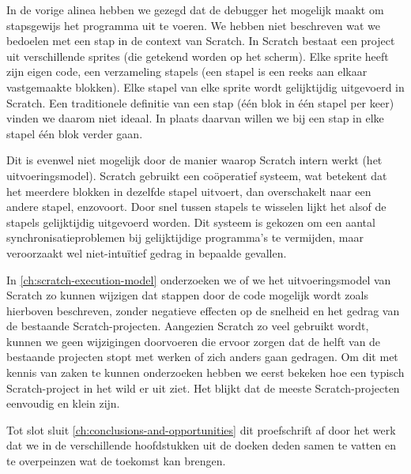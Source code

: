 \documentclass[main]{subfiles}
\begin{document}
In de vorige alinea hebben we gezegd dat de debugger het mogelijk maakt om stapsgewijs het programma uit te voeren.
We hebben niet beschreven wat we bedoelen met een stap in de context van Scratch.
In Scratch bestaat een project uit verschillende sprites (die getekend worden op het scherm).
Elke sprite heeft zijn eigen code, een verzameling stapels (een stapel is een reeks aan elkaar vastgemaakte blokken).
Elke stapel van elke sprite wordt gelijktijdig uitgevoerd in Scratch.
Een traditionele definitie van een stap (één blok in één stapel per keer) vinden we daarom niet ideaal.
In plaats daarvan willen we bij een stap in elke stapel één blok verder gaan.

Dit is evenwel niet mogelijk door de manier waarop Scratch intern werkt (het uitvoeringsmodel).
Scratch gebruikt een coöperatief systeem, wat betekent dat het meerdere blokken in dezelfde stapel uitvoert, dan overschakelt naar een andere stapel, enzovoort.
Door snel tussen stapels te wisselen lijkt het alsof de stapels gelijktijdig uitgevoerd worden.
Dit systeem is gekozen om een aantal synchronisatieproblemen bij gelijktijdige programma's te vermijden, maar veroorzaakt wel niet-intuïtief gedrag in bepaalde gevallen.

In \cref{ch:scratch-execution-model} onderzoeken we of we het uitvoeringsmodel van Scratch zo kunnen wijzigen dat stappen door de code mogelijk wordt zoals hierboven beschreven, zonder negatieve effecten op de snelheid en het gedrag van de bestaande Scratch-projecten.
Aangezien Scratch zo veel gebruikt wordt, kunnen we geen wijzigingen doorvoeren die ervoor zorgen dat de helft van de bestaande projecten stopt met werken of zich anders gaan gedragen.
Om dit met kennis van zaken te kunnen onderzoeken hebben we eerst bekeken hoe een typisch Scratch-project in het wild er uit ziet.
Het blijkt dat de meeste Scratch-projecten eenvoudig en klein zijn.

Tot slot sluit \cref{ch:conclusions-and-opportunities} dit proefschrift af door het werk dat we in de verschillende hoofdstukken uit de doeken deden samen te vatten en te overpeinzen wat de toekomst kan brengen.

\end{document}
